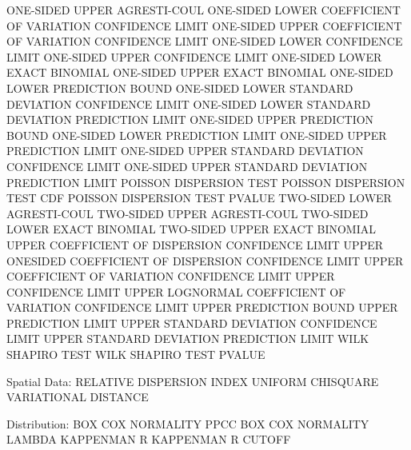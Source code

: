    ONE-SIDED UPPER AGRESTI-COUL
   ONE-SIDED LOWER COEFFICIENT OF VARIATION CONFIDENCE LIMIT
   ONE-SIDED UPPER COEFFICIENT OF VARIATION CONFIDENCE LIMIT
   ONE-SIDED LOWER CONFIDENCE LIMIT
   ONE-SIDED UPPER CONFIDENCE LIMIT
   ONE-SIDED LOWER EXACT BINOMIAL
   ONE-SIDED UPPER EXACT BINOMIAL
   ONE-SIDED LOWER PREDICTION BOUND
   ONE-SIDED LOWER STANDARD DEVIATION CONFIDENCE LIMIT
   ONE-SIDED LOWER STANDARD DEVIATION PREDICTION LIMIT
   ONE-SIDED UPPER PREDICTION BOUND
   ONE-SIDED LOWER PREDICTION LIMIT
   ONE-SIDED UPPER PREDICTION LIMIT
   ONE-SIDED UPPER STANDARD DEVIATION CONFIDENCE LIMIT
   ONE-SIDED UPPER STANDARD DEVIATION PREDICTION LIMIT
   POISSON DISPERSION TEST
   POISSON DISPERSION TEST CDF
   POISSON DISPERSION TEST PVALUE
   TWO-SIDED LOWER AGRESTI-COUL
   TWO-SIDED UPPER AGRESTI-COUL
   TWO-SIDED LOWER EXACT BINOMIAL
   TWO-SIDED UPPER EXACT BINOMIAL
   UPPER COEFFICIENT OF DISPERSION CONFIDENCE LIMIT
   UPPER ONESIDED COEFFICIENT OF DISPERSION CONFIDENCE LIMIT
   UPPER COEFFICIENT OF VARIATION CONFIDENCE LIMIT
   UPPER CONFIDENCE LIMIT
   UPPER LOGNORMAL COEFFICIENT OF VARIATION CONFIDENCE LIMIT
   UPPER PREDICTION BOUND
   UPPER PREDICTION LIMIT
   UPPER STANDARD DEVIATION CONFIDENCE LIMIT
   UPPER STANDARD DEVIATION PREDICTION LIMIT
   WILK SHAPIRO TEST
   WILK SHAPIRO TEST PVALUE

Spatial Data:
   RELATIVE DISPERSION INDEX
   UNIFORM CHISQUARE
   VARIATIONAL DISTANCE

Distribution:
   BOX COX NORMALITY PPCC
   BOX COX NORMALITY LAMBDA
   KAPPENMAN R
   KAPPENMAN R CUTOFF

